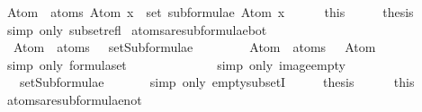 \begin{isabellebody}
\ {\isachardoublequoteopen}Atom\ {\isacharbackquote}\ atoms\ {\isacharparenleft}Atom\ x{\isacharparenright}\ {\isacharequal}\ set\ {\isacharparenleft}subformulae\ {\isacharparenleft}Atom\ x{\isacharparenright}{\isacharparenright}{\isachardoublequoteclose}\isanewline
\ \ \ \ \isamarkupfalse%
\ this\isanewline
\ \ \isamarkupfalse%
\ \isamarkupfalse%
\ {\isacharquery}thesis\ \isanewline
\ \ \ \ \isamarkupfalse%
\ {\isacharparenleft}simp\ only{\isacharcolon}\ subset{\isacharunderscore}refl{\isacharparenright}\isanewline
{}\isamarkupfalse%
%
\endisatagproof
{\isafoldproof}%
%
\isadelimproof
\isanewline
%
\endisadelimproof
\isanewline
{}\isamarkupfalse%
\ atoms{\isacharunderscore}are{\isacharunderscore}subformulae{\isacharunderscore}bot{\isacharcolon}\ \isanewline
\ \ {\isachardoublequoteopen}Atom\ {\isacharbackquote}\ atoms\ {\isasymbottom}\ {\isasymsubseteq}\ setSubformulae\ {\isasymbottom}{\isachardoublequoteclose}\ \ \isanewline
%
\isadelimproof
%
\endisadelimproof
%
\isatagproof
{}\isamarkupfalse%
\ {\isacharminus}\isanewline
\ \ \isamarkupfalse%
\ {\isachardoublequoteopen}Atom\ {\isacharbackquote}\ atoms\ {\isasymbottom}\ {\isacharequal}\ Atom\ {\isacharbackquote}\ {\isasymemptyset}{\isachardoublequoteclose}\isanewline
\ \ \ \ \isamarkupfalse%
\ {\isacharparenleft}simp\ only{\isacharcolon}\ formula{\isachardot}set{\isacharparenleft}{}{\isacharparenright}{\isacharparenright}\isanewline
\ \ \isamarkupfalse%
\ \isamarkupfalse%
\ {\isachardoublequoteopen}{\isasymdots}\ {\isacharequal}\ {\isasymemptyset}{\isachardoublequoteclose}\isanewline
\ \ \ \ \isamarkupfalse%
\ {\isacharparenleft}simp\ only{\isacharcolon}\ image{\isacharunderscore}empty{\isacharparenright}\isanewline
\ \ \isamarkupfalse%
\ \isamarkupfalse%
\ {\isachardoublequoteopen}{\isasymdots}\ {\isasymsubseteq}\ setSubformulae\ {\isasymbottom}{\isachardoublequoteclose}\isanewline
\ \ \ \ \isamarkupfalse%
\ {\isacharparenleft}simp\ only{\isacharcolon}\ empty{\isacharunderscore}subsetI{\isacharparenright}\isanewline
\ \ \isamarkupfalse%
\ \isamarkupfalse%
\ {\isacharquery}thesis\isanewline
\ \ \ \ \isamarkupfalse%
\ this\isanewline
{}\isamarkupfalse%
%
\endisatagproof
{\isafoldproof}%
%
\isadelimproof
\isanewline
%
\endisadelimproof
\isanewline
{}\isamarkupfalse%
\ atoms{\isacharunderscore}are{\isacharunderscore}subformulae{\isacharunderscore}not{\isacharcolon}\ \isanewline

\end{isabellebody}
